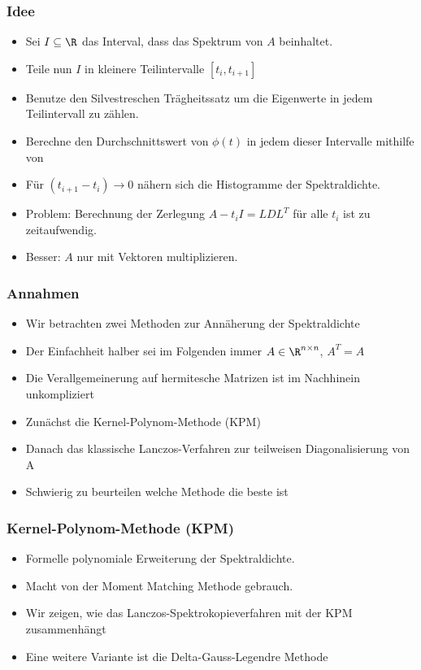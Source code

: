 \begin{frame}
    \frametitle{Idee}
    \begin{itemize}
        \item Sei $I \subseteq \R$ das Interval, dass das Spektrum von $A$ beinhaltet.
        \item Teile nun $I$ in kleinere Teilintervalle $[t_i, t_{i+1}]$
        \item Benutze den Silvestreschen Trägheitssatz um die Eigenwerte in jedem Teilintervall zu zählen.
        \item Berechne den Durchschnittswert von $\phi(t)$ in jedem dieser Intervalle mithilfe von %
        \item Für $(t_{i+1} - t_i) \longrightarrow 0$ nähern sich die Histogramme der Spektraldichte.
        \item Problem: Berechnung der Zerlegung $A - t_i I = LDL^T$ für alle $t_i$ ist zu zeitaufwendig.
        \item Besser: $A$ nur mit Vektoren multiplizieren.
    \end{itemize}
\end{frame}

\begin{frame}
    \frametitle{Annahmen}
    \begin{itemize}
        \item Wir betrachten zwei Methoden zur Annäherung der Spektraldichte
        \item Der Einfachheit halber sei im Folgenden immer $A \in \R^{n \times n}$, $A^T = A$
        \item Die Verallgemeinerung auf hermitesche Matrizen ist im Nachhinein unkompliziert
        \item Zunächst die Kernel-Polynom-Methode (KPM)
        \item Danach das klassische Lanczos-Verfahren zur teilweisen Diagonalisierung von A
        \item Schwierig zu beurteilen welche Methode die beste ist
    \end{itemize}
\end{frame}

\begin{frame}
    \frametitle{Kernel-Polynom-Methode (KPM)}
    \begin{itemize}
        \item Formelle polynomiale Erweiterung der Spektraldichte.
        \item Macht von der Moment Matching Methode gebrauch.
        \item Wir zeigen, wie das Lanczos-Spektrokopieverfahren mit der KPM zusammenhängt
        \item Eine weitere Variante ist die Delta-Gauss-Legendre Methode
    \end{itemize}
\end{frame}